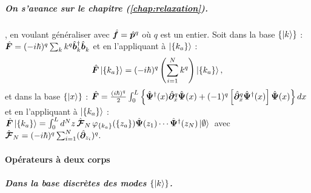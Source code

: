 \begin{mdframed}[
	linewidth=0.5pt, 
	backgroundcolor=gray!5, 
	roundcorner=50pt,	
	innerleftmargin=5pt,
    innerrightmargin=5pt,
    innertopmargin=-10pt,
    innerbottommargin=2pt,
    leftmargin=2pt,
    rightmargin=2pt
	]
\subparagraph{On s'avance sur le chapitre (\ref{chap:relaxation}).} , en voulant généraliser avec $\hat{\bm{f}} = \hat{\bm{p}}^q$ où $q$ est un entier. Soit dans la base \(\{\ket{k}\}\) : \(\hat{\bm{F}} = (-i\hbar)^q \sum_k k^q \hat{\bm{b}}_k^\dagger \hat{\bm{b}}_k^{} \) et en l'appliquant à \(\ket{\{k_a\}}\) :  
\begin{eqnarray}
	 \hat{\bm{F}} \ket{\{k_a\}} = (-i\hbar)^q \left( \sum_{i = 1}^N k^q \right) \ket{\{k_a\}},
\end{eqnarray}
et dans la base \(\{\ket{x}\}\) : 	
\(
	\hat{\bm{F}}  =  \frac{(i\hbar)^q}2 \int_0^L \left \{  \hat{\bm{\Psi}}^\dag(x) \hat{\bm{\partial}}_x^q \hat{\bm{\Psi}}(x) + (-1)^q \left [\hat{\bm{\partial}}_x^q \hat{\bm{\Psi}}^\dag(x)\right ]\hat{\bm{\Psi}}(x)\right \} dx
\)
et en l'appliquant à \(\ket{\{k_a\}}\) : 
\(
	\hat{\bm{F}}\ket{ \{k_a\}} =  \int_0^L d^N z \, \hat{\bm{\mathcal{F}}}_N \, \varphi_{\{k_a\}}(\{z_a\} ) \hat{\bm{\Psi}}(z_1) \cdots \hat{\bm{\Psi}}^\dag(z_N) \ket{\emptyset}\, 
\) \mbox{avec} 
\(\hat{\bm{\mathcal{F}}}_N = (-i\hbar)^q \sum_{i=1}^N (\hat{\bm{\partial}}_{z_i})^q.
\)
\end{mdframed}

\paragraph{Opérateurs à deux corps}

\subparagraph{Dans la base discrètes des modes \( \{ \ket{k} \} \).}

